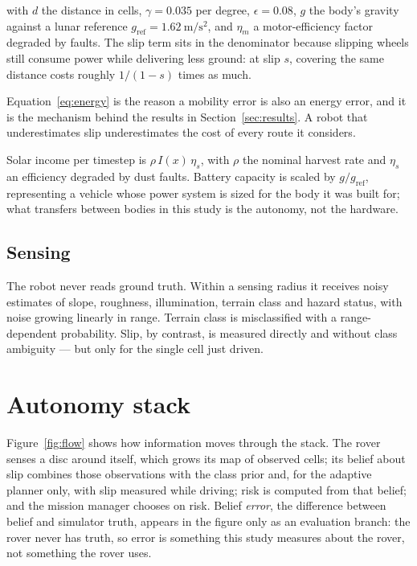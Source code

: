 \documentclass[11pt]{article}
\begin{document}
with $d$ the distance in cells, $\gamma = 0.035$ per degree,
$\epsilon = 0.08$, $g$ the body's gravity against a lunar reference
$g_{\mathrm{ref}} = 1.62~\mathrm{m/s^2}$, and $\eta_m$ a motor-efficiency
factor degraded by faults. The slip term sits in the denominator because
slipping wheels still consume power while delivering less ground: at slip $s$,
covering the same distance costs roughly $1/(1-s)$ times as much.

Equation~\ref{eq:energy} is the reason a mobility error is also an energy
error, and it is the mechanism behind the results in
Section~\ref{sec:results}. A robot that underestimates slip underestimates the
cost of every route it considers.

Solar income per timestep is $\rho\, I(x)\, \eta_s$, with $\rho$ the nominal
harvest rate and $\eta_s$ an efficiency degraded by dust faults. Battery
capacity is scaled by $g/g_{\mathrm{ref}}$, representing a vehicle whose power
system is sized for the body it was built for; what transfers between bodies
in this study is the autonomy, not the hardware.

\subsection{Sensing}

The robot never reads ground truth. Within a sensing radius it receives noisy
estimates of slope, roughness, illumination, terrain class and hazard status,
with noise growing linearly in range. Terrain class is misclassified with a
range-dependent probability. Slip, by contrast, is measured directly and
without class ambiguity --- but only for the single cell just driven.

\section{Autonomy stack}
\label{sec:autonomy}

Figure~\ref{fig:flow} shows how information moves through the stack. The
rover senses a disc around itself, which grows its map of observed cells; its
belief about slip combines those observations with the class prior and, for
the adaptive planner only, with slip measured while driving; risk is computed
from that belief; and the mission manager chooses on risk. Belief
\emph{error}, the difference between belief and simulator truth, appears in
the figure only as an evaluation branch: the rover never has truth, so error
is something this study measures about the rover, not something the rover
uses.
\end{document}
